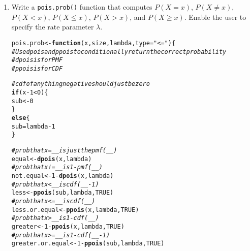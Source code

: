 \documentclass{article}\usepackage[]{graphicx}\usepackage[]{xcolor}
\makeatletter
\newcommand{\hlnum}[1]{\textcolor[rgb]{0.686,0.059,0.569}{#1}}%
\newcommand{\hlsng}[1]{\textcolor[rgb]{0.192,0.494,0.8}{#1}}%
\newcommand{\hlcom}[1]{\textcolor[rgb]{0.678,0.584,0.686}{\textit{#1}}}%
\newcommand{\hlopt}[1]{\textcolor[rgb]{0,0,0}{#1}}%
\newcommand{\hldef}[1]{\textcolor[rgb]{0.345,0.345,0.345}{#1}}%
\newcommand{\hlkwa}[1]{\textcolor[rgb]{0.161,0.373,0.58}{\textbf{#1}}}%
\newcommand{\hlkwb}[1]{\textcolor[rgb]{0.69,0.353,0.396}{#1}}%
\newcommand{\hlkwc}[1]{\textcolor[rgb]{0.333,0.667,0.333}{#1}}%
\newcommand{\hlkwd}[1]{\textcolor[rgb]{0.737,0.353,0.396}{\textbf{#1}}}%
\newenvironment{kframe}{%
 \def\at@end@of@kframe{}%
 \ifinner\ifhmode%
  \def\at@end@of@kframe{\end{minipage}}%
  \begin{minipage}{\columnwidth}%
 \fi\fi%
 \def\FrameCommand##1{\hskip\@totalleftmargin \hskip-\fboxsep
 \colorbox{shadecolor}{##1}\hskip-\fboxsep
     \hskip-\linewidth \hskip-\@totalleftmargin \hskip\columnwidth}%
 \MakeFramed {\advance\hsize-\width
   \@totalleftmargin\z@ \linewidth\hsize
   \@setminipage}}%
 {\par\unskip\endMakeFramed%
 \at@end@of@kframe}
\newenvironment{knitrout}{}{} %
\makeatother
\begin{document}
  \begin{enumerate}
    \item Write a \texttt{pois.prob()} function that computes $P(X=x)$, 
    $P(X \neq x)$, $P(X<x)$, $P(X \leq x)$, $P(X > x)$, and $P(X \geq x).$ Enable the user to specify the rate parameter $\lambda$.
\begin{knitrout}\scriptsize
{}\color{fgcolor}\begin{kframe}
\begin{alltt}
\hldef{pois.prob} \hlkwb{<-} \hlkwa{function}\hldef{(}\hlkwc{x}\hldef{,} \hlkwc{size}\hldef{,} \hlkwc{lambda}\hldef{,} \hlkwc{type}\hldef{=}\hlsng{"<="}\hldef{)\{}
  \hlcom{# Use dpois and ppois to conditionally return the correct probability}
  \hlcom{#dpois is for PMF}
  \hlcom{#ppois is for CDF }

  \hlcom{#cdf of anything negative should just be zero}
  \hlkwa{if} \hldef{(x}\hlopt{-}\hlnum{1} \hlopt{<} \hlnum{0}\hldef{)\{}
    \hldef{sub} \hlkwb{<-} \hlnum{0}
  \hldef{\}}
  \hlkwa{else}\hldef{\{}
    \hldef{sub}\hlkwb{=}\hldef{lambda}\hlopt{-}\hlnum{1}
  \hldef{\}}

  \hlcom{#prob that x=__ is just the pmf(__)}
  \hldef{equal} \hlkwb{<-} \hlkwd{dpois}\hldef{(x,lambda)}
  \hlcom{#prob that x!=__ is 1-pmf(__)}
  \hldef{not.equal} \hlkwb{<-} \hlnum{1}\hlopt{-} \hlkwd{dpois}\hldef{(x,lambda)}
  \hlcom{#prob that x<__ is cdf(__ - 1)}
  \hldef{less} \hlkwb{<-} \hlkwd{ppois}\hldef{(sub,lambda,}\hlnum{TRUE}\hldef{)}
  \hlcom{#prob that x <= __ is cdf(__)}
  \hldef{less.or.equal} \hlkwb{<-} \hlkwd{ppois}\hldef{(x,lambda,}\hlnum{TRUE}\hldef{)}
  \hlcom{#prob that x> __ is 1-cdf(__)}
  \hldef{greater} \hlkwb{<-} \hlnum{1}\hlopt{-} \hlkwd{ppois}\hldef{(x,lambda,}\hlnum{TRUE}\hldef{)}
  \hlcom{#prob that x>= __ is 1-cdf(__-1)}
  \hldef{greater.or.equal} \hlkwb{<-} \hlnum{1}\hlopt{-}\hlkwd{ppois}\hldef{(sub,lambda,}\hlnum{TRUE}\hldef{)}


\end{alltt}
\end{kframe}
\end{knitrout}
\end{enumerate}
\end{document}
